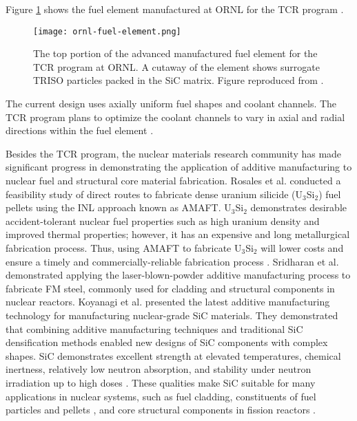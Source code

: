 Figure \ref{fig:ornl-fuel-element} shows the fuel element manufactured at 
\gls{ORNL} for the \gls{TCR} program \cite{betzler_transformational_2020}. 
\begin{figure}[htb!]
    \centering
    \texttt{[image: ornl-fuel-element.png]} 
    \caption{The top portion of the advanced manufactured fuel element 
    for the \acrfull{TCR} program at \acrfull{ORNL}.
    A cutaway of the element shows surrogate TRISO particles packed in the SiC matrix.
    Figure reproduced from \cite{betzler_transformational_2020}.}
    \label{fig:ornl-fuel-element}
\end{figure}
The current design uses axially uniform fuel shapes and coolant channels. 
The \gls{TCR} program plans to optimize the coolant channels to vary in axial 
and radial directions within the fuel element 
\cite{betzler_transformational_2020,sobes_artificial_2020}. 

Besides the \gls{TCR} program, the nuclear materials research community has made 
significant progress in demonstrating the application of additive manufacturing 
to nuclear fuel and structural core material fabrication. 
Rosales et al. \cite{rosales_characterizing_2019} conducted a feasibility study 
of direct routes to fabricate dense uranium silicide (U$_3$Si$_2$) fuel pellets 
using the \gls{INL} approach known as \gls{AMAFT}. 
U$_3$Si$_2$ demonstrates desirable accident-tolerant nuclear fuel properties 
such as high uranium density and improved thermal properties; however, it has 
an expensive and long metallurgical fabrication process. 
Thus, using \gls{AMAFT} to fabricate U$_3$Si$_2$ will lower costs and ensure a
timely and commercially-reliable fabrication process \cite{rosales_characterizing_2019}.
Sridharan et al. \cite{sridharan_performance_2019} demonstrated applying
the laser-blown-powder additive manufacturing process to fabricate \gls{FM} steel, 
commonly used for cladding and structural components in nuclear reactors. 
Koyanagi et al. \cite{koyanagi_additive_2020} presented the latest 
additive manufacturing technology for manufacturing nuclear-grade \gls{SiC} materials. 
They demonstrated that combining additive manufacturing techniques and 
traditional \gls{SiC} densification methods enabled new designs of \gls{SiC} 
components with complex shapes. 
\gls{SiC} demonstrates excellent strength at elevated temperatures, chemical inertness, 
relatively low neutron absorption, and stability under neutron irradiation up 
to high doses \cite{sauder_ceramic_2014, snead_handbook_2007,koyanagi_additive_2020}. 
These qualities make \gls{SiC} suitable for many applications in nuclear systems, 
such as fuel cladding, constituents of fuel particles \cite{snead_handbook_2007} 
and pellets \cite{terrani_progress_2015}, and core structural components in fission 
reactors \cite{sauder_ceramic_2014}. 

